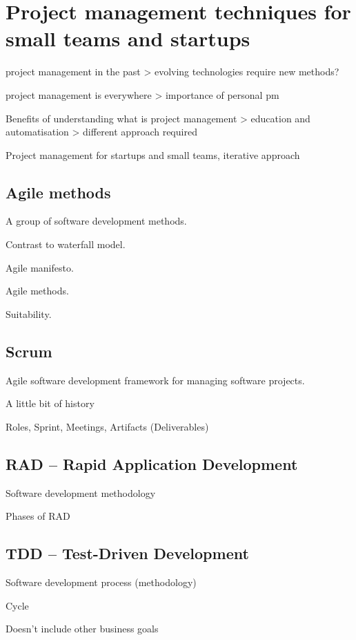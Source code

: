 \chapter{Project management techniques for small teams and startups}

project management in the past > evolving technologies require new methods?

project management is everywhere > importance of personal pm

Benefits of understanding what is project management > education and automatisation > different approach required

Project management for startups and small teams, iterative approach

\section{Agile methods}

A group of software development methods.

Contrast to waterfall model.

Agile manifesto.

Agile methods.

Suitability.

\section{Scrum}

Agile software development framework for managing software projects.

A little bit of history

Roles, Sprint, Meetings, Artifacts (Deliverables)

\section{RAD -- Rapid Application Development}

Software development methodology

Phases of RAD

\section{TDD -- Test-Driven Development}

Software development process (methodology)

Cycle

Doesn't include other business goals

